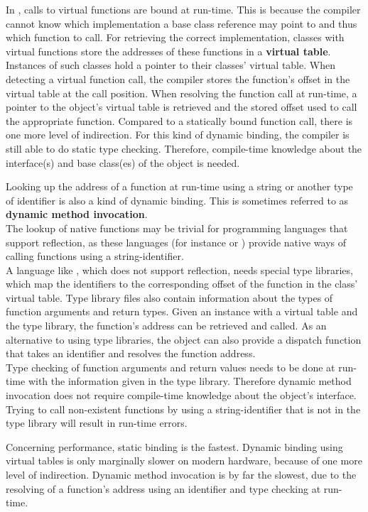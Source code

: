 In , calls to virtual functions are bound at run-time. This is because the compiler cannot know which implementation a base class reference may point to and thus which function to call. For retrieving the correct implementation, classes with virtual functions store the addresses of these functions in a \textbf{virtual table}. Instances of such classes hold a pointer to their classes' virtual table. When detecting a virtual function call, the compiler stores the function's offset in the virtual table at the call position. When resolving the function call at run-time, a pointer to the object's virtual table is retrieved and the stored offset used to call the appropriate function. Compared to a statically bound function call, there is one more level of indirection. For this kind of dynamic binding, the compiler is still able to do static type checking. Therefore, compile-time knowledge about the interface(s) and base class(es) of the object is needed. 

Looking up the address of a function at run-time using a string or another type of identifier is also a kind of dynamic binding. This is sometimes referred to as \textbf{dynamic method invocation}.\\
The lookup of native functions may be trivial for programming languages that support reflection, as these languages (for instance  or ) provide native ways of calling functions using a string-identifier.\\
A language like , which does not support reflection, needs special type libraries, which map the identifiers to the corresponding offset of the function in the class' virtual table. Type library files also contain information about the types of function arguments and return types. Given an instance with a virtual table and the type library, the function's address can be retrieved and called. As an alternative to using type libraries, the object can also provide a dispatch function that takes an identifier and resolves the function address.
\\Type checking of function arguments and return values needs to be done at run-time with the information given in the type library. Therefore dynamic method invocation does not require compile-time knowledge about the object's interface. Trying to call non-existent functions by using a string-identifier that is not in the type library will result in run-time errors.

Concerning performance, static binding is the fastest. Dynamic binding using virtual tables is only marginally slower on modern hardware, because of one more level of indirection. Dynamic method invocation is by far the slowest, due to the resolving of a function's address using an identifier and type checking at run-time. 

